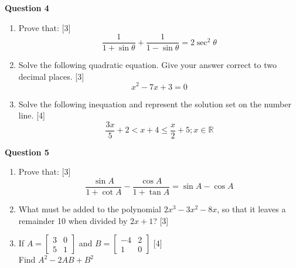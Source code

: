 \newpage
\vspace{5mm}
\noindent
\textbf{Question 4}
\begin{enumerate}[label=(\roman*)]

    \item Prove that: \hfill [3]
        \[ \frac{1}{1 + \sin \theta } + \frac{1}{1 - \sin \theta } = 2 \sec^2 \theta \]

    \item Solve the following quadratic equation. Give your answer correct to two
        decimal places. \hfill [3]
        \[ x^2 - 7x + 3 = 0 \]

    \item Solve the following inequation and represent the solution set on the 
        number line. \hfill[4]
        \[ \frac{3x}{5} + 2 < x + 4 \leq \frac{x}{2} + 5; x \in \mathbb{R} \]

\end{enumerate}

\vspace{5mm}
\noindent
\textbf{Question 5}
\begin{enumerate}[label=(\roman*)]

    \item Prove that: \hfill [3]
        \[ \frac{\sin A}{1 + \cot A} - \frac{\cos A}{1 + \tan A} = \sin A - \cos A \]

    \item What must be added to the polynomial $2x^3 - 3x^2 - 8x$, so that it 
        leaves a remainder 10 when divided by $2x+1$? \hfill [3]

    \item If $A = \begin{bmatrix} 3 & 0 \\ 5 & 1 \end{bmatrix}$ and 
        $B = \begin{bmatrix} -4 & 2 \\ 1 & 0 \end{bmatrix}$ \hfill [4] \\
        Find $A^2 - 2AB + B^2$

\end{enumerate}
